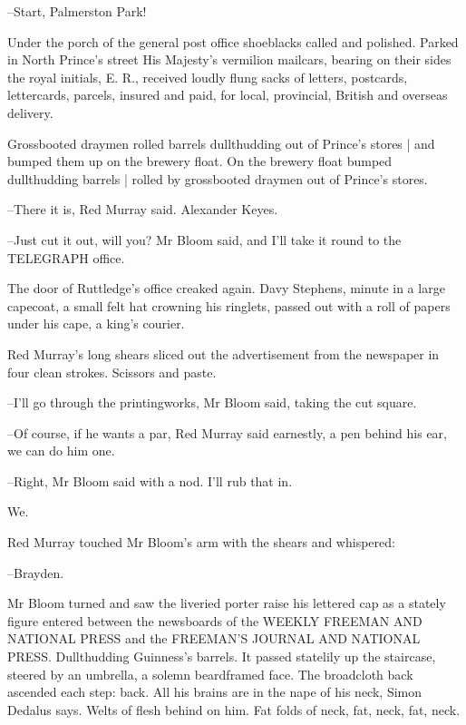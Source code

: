 --Start, Palmerston Park!



Under the porch of the general post office
shoeblacks called and polished.
Parked in North Prince's street
His Majesty's vermilion mailcars,
bearing on their sides the royal initials, E. R.,
received loudly flung sacks
of letters, postcards, lettercards, parcels, insured and paid,
for local, provincial, British and overseas delivery.



Grossbooted draymen rolled barrels dullthudding
out of Prince's stores |
and bumped them up on the brewery float.
On the brewery float bumped dullthudding barrels |
rolled by grossbooted draymen out of Prince's stores.

--There it is,
Red Murray said.
Alexander Keyes.

--Just cut it out, will you?
Mr Bloom said,
and I'll take it round to the TELEGRAPH office.

The door of Ruttledge's office creaked again.
Davy Stephens,
minute in a large capecoat,
a small felt hat crowning his ringlets,
passed out with a roll of papers under his cape,
a king's courier.

Red Murray's long shears sliced out the advertisement
from the newspaper in four clean strokes.
Scissors and paste.

--I'll go through the printingworks,
Mr Bloom said,
taking the cut square.

--Of course, if he wants a par,
Red Murray said earnestly, a pen behind his ear,
we can do him one.

--Right,
Mr Bloom said with a nod.
I'll rub that in.

We.



Red Murray touched Mr Bloom's arm with the shears and whispered:

--Brayden.

Mr Bloom turned and saw the liveried porter raise his lettered cap
as a stately figure entered between the newsboards
of the WEEKLY FREEMAN AND NATIONAL PRESS
and the FREEMAN'S JOURNAL AND NATIONAL PRESS.
Dullthudding Guinness's barrels.
It passed statelily up the staircase,
steered by an umbrella,
a solemn beardframed face.
The broadcloth back ascended each step: back.
All his brains are in the nape of his neck, Simon Dedalus says.
Welts of flesh behind on him.
Fat folds of neck, fat, neck, fat, neck.

